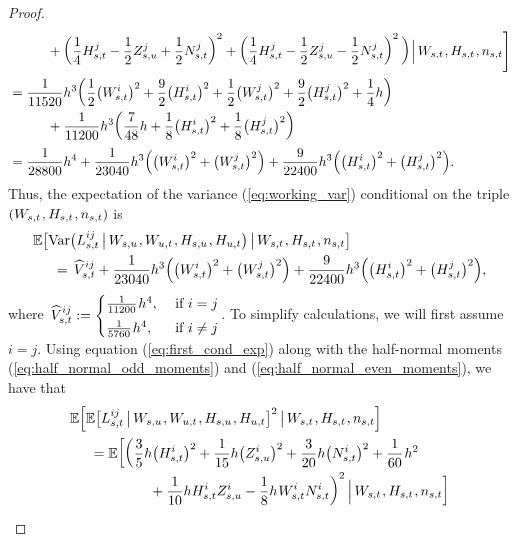 \documentclass[sn-mathphys-num]{sn-jnl}%
\newcommand{\E}{\mathbb{E}}
\newcommand{\m}{\hspace{0.25mm}}
\newcommand{\mm}{\hspace{5mm}}
\newcommand{\mmm}{\hspace{10mm}}
\newcommand{\var}{\mathrm{Var}}
\begin{document}
\begin{proof}
\begin{align*}
&\mmm + \bigg(\frac{1}{4}H_{s,t}^j - \frac{1}{2}Z_{s,u}^j + \frac{1}{2}N_{s,t}^j\bigg)^2 + \bigg(\frac{1}{4}H_{s,t}^j - \frac{1}{2}Z_{s,u}^j - \frac{1}{2}N_{s,t}^j\bigg)^2\,\bigg)\m\Big|\, W_{s,t}\m, H_{s,t}\m, n_{s,t}\Bigg]\\
& = \frac{1}{11520}h^3\bigg(\frac{1}{2}\big(W_{s,t}^i\big)^2 + \frac{9}{2}\big(H_{s,t}^i\big)^2 + \frac{1}{2}\big(W_{s,t}^j\big)^2 + \frac{9}{2}\big(H_{s,t}^j\big)^2 + \frac{1}{4}h\bigg)\\[-3pt]
&\mmm + \frac{1}{11200}h^3\bigg(\frac{7}{48}h + \frac{1}{8}\big(H_{s,t}^i\big)^2 + \frac{1}{8}\big(H_{s,t}^j\big)^2\bigg)\\
& = \frac{1}{28800}h^4 + \frac{1}{23040}h^3\Big(\big(W_{s,t}^i\big)^2  + \big(W_{s,t}^j\big)^2\Big) + \frac{9}{22400}h^3 \Big(\big(H_{s,t}^i\big)^2 + \big(H_{s,t}^j\big)^2\Big).
\end{align*}
Thus, the expectation of the variance (\ref{eq:working_var}) conditional on the triple $(W_{s,t}\m, H_{s,t}\m, n_{s,t})$ is\
\begin{align*}
&\E\big[\var\big(L_{s,t}^{ij}\,\big|\, W_{s,u}\m, W_{u,t}\m, H_{s,u}\m, H_{u,t}\big)\,\big|\,W_{s,t}\m, H_{s,t}\m, n_{s,t}\big]\\
&\mm = \,\widehat{V}_{s,t}^{ij} + \frac{1}{23040}h^3\Big(\big(W_{s,t}^i\big)^2  + \big(W_{s,t}^j\big)^2\Big) + \frac{9}{22400}h^3 \Big(\big(H_{s,t}^i\big)^2 + \big(H_{s,t}^j\big)^2\Big),
\end{align*}
where $\, \widehat{V}_{s,t}^{ij} := \begin{cases} \frac{1}{11200}\m h^4, & \text{ if } i = j\\[3pt]
\frac{1}{5760}\m h^4, & \text{ if } i\neq j\end{cases}$. To simplify calculations, we will first assume $i=j$.\medbreak\noindent
Using equation (\ref{eq:first_cond_exp}) along with the half-normal moments (\ref{eq:half_normal_odd_moments}) and (\ref{eq:half_normal_even_moments}), we have that
\begin{align*}
&\E\Big[\E\big[L_{s,t}^{ij}\,\big|\, W_{s,u}\m, W_{u,t}\m, H_{s,u}\m, H_{u,t}\big]^2\,\big|\, W_{s,t}\m, H_{s,t}\m, n_{s,t}\Big]\\
&\mm = \E\bigg[\bigg(\frac{3}{5}h\big(H_{s,t}^i\big)^2 + \frac{1}{15}h \big(Z_{s,u}^i\big)^2 + \frac{3}{20}h \big(N_{s,t}^i\big)^2 + \frac{1}{60}\m h^2\\[-3pt]
&\hspace{20mm} + \frac{1}{10}h H_{s,t}^i Z_{s,u}^i - \frac{1}{8}h\m W_{s,t}^i N_{s,t}^i\bigg)^2\,\Big|\, W_{s,t}\m, H_{s,t}\m, n_{s,t}\bigg]\\

\end{align*}
\end{proof}
\end{document}
